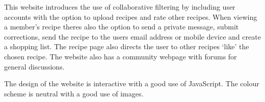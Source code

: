 This website introduces the use of collaborative filtering by including user accounts with the option to upload recipes and rate other recipes. When viewing a member’s recipe theres also the option to send a private message, submit corrections, send the recipe to the users email address or mobile device and create a shopping list. The recipe page also directs the user to other recipes ‘like’ the chosen recipe. The website also has a community webpage with forums for general discussions. 

The design of the website is interactive with a good use of JavaScript. The colour scheme is neutral with a good use of images.



